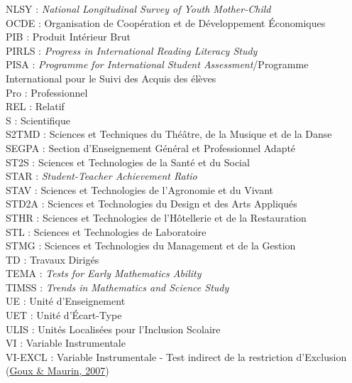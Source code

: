 \documentclass[
]{book}
\begin{document}
NLSY : \emph{National Longitudinal Survey of Youth Mother-Child}\\
OCDE : Organisation de Coopération et de Développement Économiques\\
PIB : Produit Intérieur Brut\\
PIRLS : \emph{Progress in International Reading Literacy Study}\\
PISA : \emph{Programme for International Student Assessment}/Programme International pour le Suivi des Acquis des élèves\\
Pro : Professionnel\\
REL : Relatif\\
S : Scientifique\\
S2TMD : Sciences et Techniques du Théâtre, de la Musique et de la Danse\\
SEGPA : Section d'Enseignement Général et Professionnel Adapté\\
ST2S : Sciences et Technologies de la Santé et du Social\\
STAR : \emph{Student-Teacher Achievement Ratio}\\
STAV : Sciences et Technologies de l'Agronomie et du Vivant\\
STD2A : Sciences et Technologies du Design et des Arts Appliqués\\
STHR : Sciences et Technologies de l'Hôtellerie et de la Restauration\\
STL : Sciences et Technologies de Laboratoire\\
STMG : Sciences et Technologies du Management et de la Gestion\\
TD : Travaux Dirigés\\
TEMA : \emph{Tests for Early Mathematics Ability}\\
TIMSS : \emph{Trends in Mathematics and Science Study}\\
UE : Unité d'Enseignement\\
UET : Unité d'Écart-Type\\
ULIS : Unités Localisées pour l'Inclusion Scolaire\\
VI : Variable Instrumentale\\
VI-EXCL : Variable Instrumentale - Test indirect de la restriction d'Exclusion (\protect\hyperlink{ref-GOU:MAU:07}{Goux \& Maurin, 2007})

\tableofcontents
{}
\listoftables
\listoffigures

\mainmatter
\end{document}
